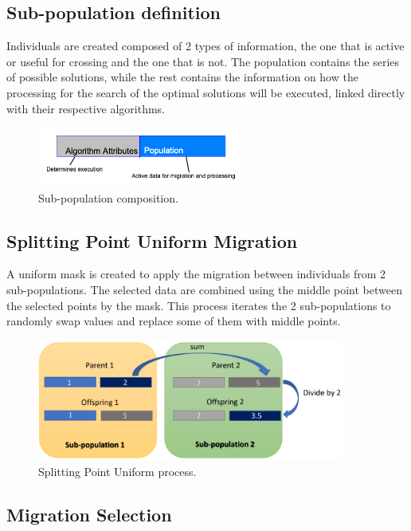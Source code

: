 \documentclass[runningheads]{llncs}
\begin{document}
\subsection{Sub-population definition}

Individuals are created composed of 2 types of information, the one that is active or useful for crossing
and the one that is not. The population contains the series of possible solutions, while the rest contains 
the information on how the processing for the search of the optimal solutions will be executed, linked directly 
with their respective algorithms.

\begin{figure}[htp]
  \centering
  \includegraphics[width=0.6\textwidth]{subpopulationDefinition.png}
  \caption{Sub-population composition.} \label{fig1}
  \end{figure}

\subsection{Splitting Point Uniform Migration}
A uniform mask is created to apply the migration between individuals
from 2 sub-populations. The selected data are combined using the middle point between the
selected points by the mask. This process iterates the 2 sub-populations to randomly swap values and
replace some of them with middle points.


\begin{figure}[htp]
  \centering
  \includegraphics[width=0.9\textwidth]{splittinPointUniform.png}
  \caption{Splitting Point Uniform process.} \label{fig1}
  \end{figure}

  \subsection{Migration Selection}
\end{document}
